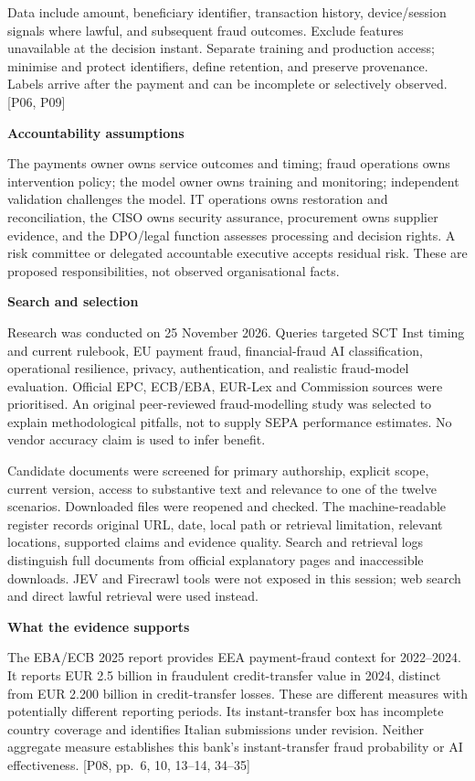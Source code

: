 \documentclass[11pt,a4paper]{article}
\newcommand{\heading}[2]{\vspace*{1mm}{\small\color{ink}\textbf{#1}}\par\vspace{2mm}{\LARGE\color{ink}\textbf{#2}}\par\vspace{3mm}}
\newcommand{\sub}[1]{\par\vspace{2mm}\textbf{\color{ink}#1}\par}
\newcommand{\src}[1]{{\small[#1]}}
\newcommand{\newpageof}[2]{\clearpage\normalsize\fontsize{10.5}{12.5}\selectfont\heading{#1}{#2}}
\begin{document}
Data include amount, beneficiary identifier, transaction history, device/session signals where lawful, and subsequent fraud outcomes. Exclude features unavailable at the decision instant. Separate training and production access; minimise and protect identifiers, define retention, and preserve provenance. Labels arrive after the payment and can be incomplete or selectively observed. \src{P06, P09}
\sub{Accountability assumptions}
The payments owner owns service outcomes and timing; fraud operations owns intervention policy; the model owner owns training and monitoring; independent validation challenges the model. IT operations owns restoration and reconciliation, the CISO owns security assurance, procurement owns supplier evidence, and the DPO/legal function assesses processing and decision rights. A risk committee or delegated accountable executive accepts residual risk. These are proposed responsibilities, not observed organisational facts.

\newpageof{3 | Reference documentation}{Evidence base and course alignment}
\sub{Search and selection}
Research was conducted on 25 November 2026. Queries targeted SCT Inst timing and current rulebook, EU payment fraud, financial-fraud AI classification, operational resilience, privacy, authentication, and realistic fraud-model evaluation. Official EPC, ECB/EBA, EUR-Lex and Commission sources were prioritised. An original peer-reviewed fraud-modelling study was selected to explain methodological pitfalls, not to supply SEPA performance estimates. No vendor accuracy claim is used to infer benefit.

Candidate documents were screened for primary authorship, explicit scope, current version, access to substantive text and relevance to one of the twelve scenarios. Downloaded files were reopened and checked. The machine-readable register records original URL, date, local path or retrieval limitation, relevant locations, supported claims and evidence quality. Search and retrieval logs distinguish full documents from official explanatory pages and inaccessible downloads. JEV and Firecrawl tools were not exposed in this session; web search and direct lawful retrieval were used instead.
\sub{What the evidence supports}
The EBA/ECB 2025 report provides EEA payment-fraud context for 2022--2024. It reports EUR 2.5 billion in fraudulent credit-transfer value in 2024, distinct from EUR 2.200 billion in credit-transfer losses. These are different measures with potentially different reporting periods. Its instant-transfer box has incomplete country coverage and identifies Italian submissions under revision. Neither aggregate measure establishes this bank's instant-transfer fraud probability or AI effectiveness. \src{P08, pp.~6, 10, 13--14, 34--35}
\end{document}
